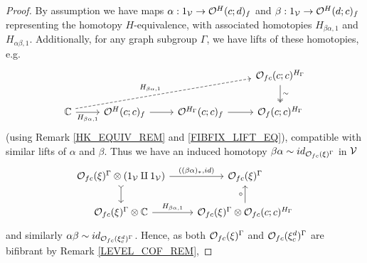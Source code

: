 \documentclass[a4paper,10pt
,draft
]{article}%
\renewcommand{\1}{\ensuremath{\mathbb{id}}}
\begin{document}
\begin{proof}
      By assumption we have maps
      $\alpha: 1_{\mathcal V} \to \mathcal{O}^H(c;d)_f$ and $\beta: 1_{\mathcal V} \to \mathcal{O}^H(d;c)_f$
      representing the homotopy $H$-equivalence,
      with associated homotopies $H_{\beta\alpha,1}$ and $H_{\alpha\beta,1}$.
      Additionally, for any graph subgroup $\Gamma$, we have lifts of these homotopies, e.g.
      \begin{equation}
            \label{OFC_HOM_LIFT}
            \begin{tikzcd}
                  &&& \O_{f c}(c;c)^{H_\Gamma} \arrow[d, two heads, "\sim"]
                  \\
                  \mathbb C \arrow[r, "H_{\beta\alpha,1}"'] \arrow[urrr, dashed, shift left, "H_{\beta\alpha,1}"]
                  &
                  \O^H(c;c)_f \arrow[r]
                  &
                  \O^{H_\Gamma}(c;c)_f \arrow[r]
                  &
                  \O_f(c;c)^{H_\Gamma}
            \end{tikzcd}
      \end{equation}
      (using Remark \ref{HK_EQUIV_REM} and \eqref{FIBFIX_LIFT_EQ}), compatible with similar lifts of $\alpha$ and $\beta$.
      Thus we have an induced homotopy $\beta\alpha \sim id_{\mathcal{O}_{f c}(\xi)^{\Gamma}}$ in $\mathcal V$
      \begin{equation}
            \begin{tikzcd}
                  \O_{f c}(\ksi)^{\Gamma} \otimes (1_\V \amalg 1_\V) \arrow[d, tail] \arrow[r, "{((\beta\alpha)_{\**}, id)}"]
                  &
                  \O_{f c}(\ksi)^\Gamma
                  \\                  
                  \O_{f c}(\ksi)^\Gamma \otimes \mathbb C \arrow[r, "H_{\beta\alpha,1}"]
                  &
                  \O_{f c}(\ksi)^\Gamma \otimes \O_{f c}(c;c)^{H_\Gamma} \arrow[u, "\circ"]
            \end{tikzcd}
      \end{equation}
      and similarly $\alpha\beta \sim id_{\mathcal{O}_{f c}(\xi_c^d)^\Gamma}$.
      Hence, as both $\mathcal{O}_{f c}(\xi)^\Gamma$ and $\mathcal{O}_{f c}(\xi_c^d)^\Gamma$ are bifibrant by Remark \ref{LEVEL_COF_REM},

\end{proof}
\end{document}
